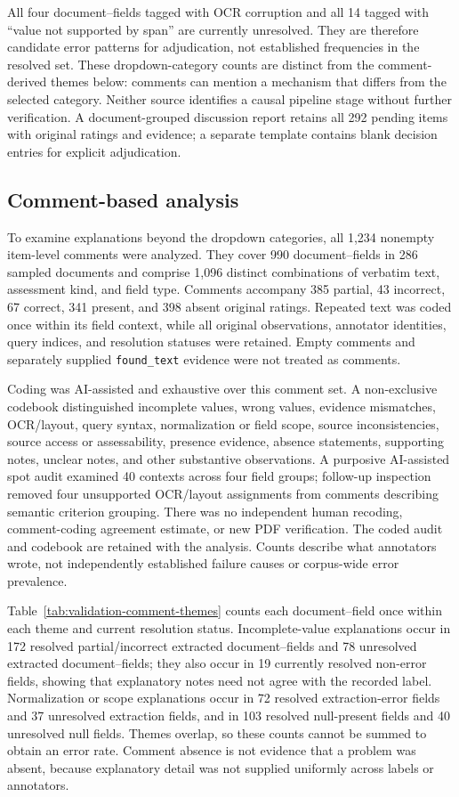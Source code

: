 All four document--fields tagged with OCR corruption and all 14 tagged with ``value not supported by span'' are currently unresolved. They are therefore candidate error patterns for adjudication, not established frequencies in the resolved set. These dropdown-category counts are distinct from the comment-derived themes below: comments can mention a mechanism that differs from the selected category. Neither source identifies a causal pipeline stage without further verification. A document-grouped discussion report retains all 292 pending items with original ratings and evidence; a separate template contains blank decision entries for explicit adjudication.



\subsection*{Comment-based analysis}
To examine explanations beyond the dropdown categories, all 1,234 nonempty item-level comments were analyzed. They cover 990 document--fields in 286 sampled documents and comprise 1,096 distinct combinations of verbatim text, assessment kind, and field type. Comments accompany 385 partial, 43 incorrect, 67 correct, 341 present, and 398 absent original ratings. Repeated text was coded once within its field context, while all original observations, annotator identities, query indices, and resolution statuses were retained. Empty comments and separately supplied \texttt{found\_text} evidence were not treated as comments.

Coding was AI-assisted and exhaustive over this comment set. A non-exclusive codebook distinguished incomplete values, wrong values, evidence mismatches, OCR/layout, query syntax, normalization or field scope, source inconsistencies, source access or assessability, presence evidence, absence statements, supporting notes, unclear notes, and other substantive observations. A purposive AI-assisted spot audit examined 40 contexts across four field groups; follow-up inspection removed four unsupported OCR/layout assignments from comments describing semantic criterion grouping. There was no independent human recoding, comment-coding agreement estimate, or new PDF verification. The coded audit and codebook are retained with the analysis. Counts describe what annotators wrote, not independently established failure causes or corpus-wide error prevalence.

Table~\ref{tab:validation-comment-themes} counts each document--field once within each theme and current resolution status. Incomplete-value explanations occur in 172 resolved partial/incorrect extracted document--fields and 78 unresolved extracted document--fields; they also occur in 19 currently resolved non-error fields, showing that explanatory notes need not agree with the recorded label. Normalization or scope explanations occur in 72 resolved extraction-error fields and 37 unresolved extraction fields, and in 103 resolved null-present fields and 40 unresolved null fields. Themes overlap, so these counts cannot be summed to obtain an error rate. Comment absence is not evidence that a problem was absent, because explanatory detail was not supplied uniformly across labels or annotators.

